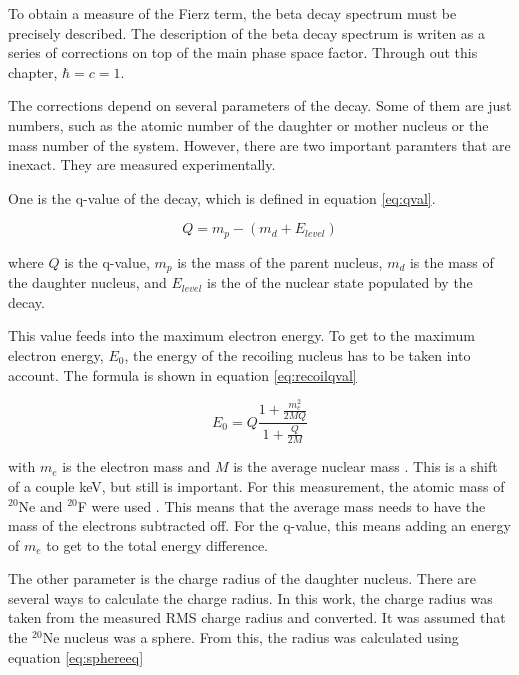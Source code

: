 

%
To obtain a measure of the Fierz term, the beta decay spectrum must be precisely described.
The description of the beta decay spectrum is writen as a series of corrections on top of the main phase space factor.  
Through out this chapter, $\hbar = c = 1$.

The corrections depend on several parameters of the decay. 
Some of them are just numbers, such as the atomic number of the daughter or mother nucleus or the mass number of the system.
However, there are two important paramters that are inexact.
They are measured experimentally.

One is the q-value of the decay, which is defined in equation \ref{eq:qval}.

\begin{equation}
	Q = m_{p} - (m_{d} + E_{level})
	\label{eq:qval}
\end{equation} 

where $Q$ is the q-value, $m_{p}$ is the mass of the parent nucleus, $m_{d}$ is the mass of the daughter nucleus, and $E_{level}$ is the of the nuclear state populated by the decay. 

This value feeds into the maximum electron energy.
To get to the maximum electron energy, $E_{0}$, the energy of the recoiling nucleus has to be taken into account.
The formula is shown in equation \ref{eq:recoilqval}

\begin{equation}
	E_{0} = Q\frac{1 + \frac{m_{e}^{2}}{2MQ}}{1 + \frac{Q}{2M}} 
	\label{eq:recoilqval}
\end{equation} 

with $m_{e}$ is the electron mass and $M$ is the average nuclear mass \cite{Hol74}.
This is a shift of a couple keV, but still is important.
For this measurement, the atomic mass of $^{20}$Ne and $^{20}$F were used \cite{Pfe12}.
This means that the average mass needs to have the mass of the electrons subtracted off. 
For the q-value, this means adding an energy of $m_{e}$ to get to the total energy difference.

The other parameter is the charge radius of the daughter nucleus.
There are several ways to calculate the charge radius.
In this work, the charge radius was taken from the measured RMS charge radius and converted.
It was assumed that the $^{20}$Ne nucleus was a sphere. 
From this, the radius was calculated using equation \ref{eq:sphereeq}


